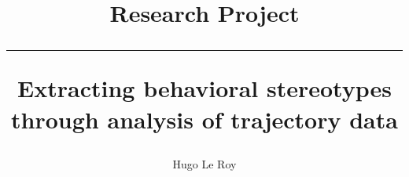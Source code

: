 \documentclass[a4paper,10pt]{article}
\title{Research Project \\ \rule{\textwidth}{0.5pt} Extracting behavioral stereotypes through analysis of trajectory data}
\author{Hugo Le Roy}
\date{}
\begin{document}
\maketitle
\begin{abstract}

\end{abstract}

%
%
%
%

\clearpage
\pagestyle{empty}

%
\label{sec:textend}
\end{document}
